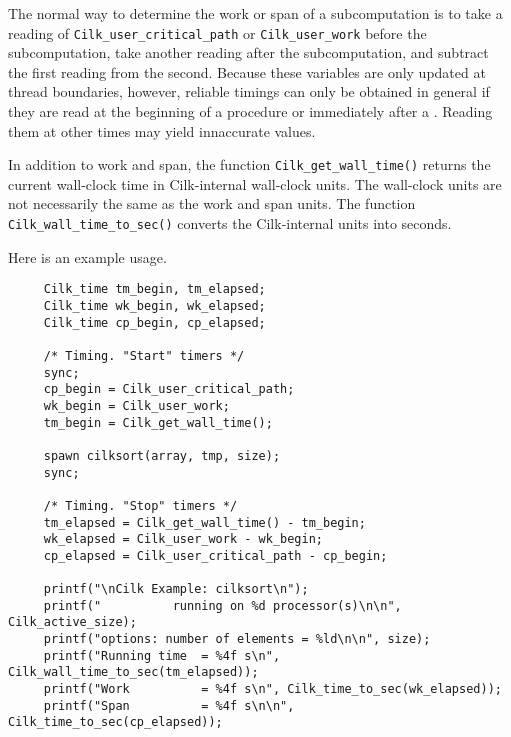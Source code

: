 The normal way to determine the work or span of a subcomputation is to
take a reading of \texttt{Cilk\_user\_critical\_path} or
\texttt{Cilk\_user\_work} before the subcomputation, take another
reading after the subcomputation, and subtract the first reading from
the second.  Because these variables are only updated at thread
boundaries, however, reliable timings can only be obtained in general
if they are read at the beginning of a procedure or immediately after
a .  Reading them at other times may yield innaccurate
values.

In addition to work and span, the function
\texttt{Cilk\_get\_wall\_time()} returns the current wall-clock time
in Cilk-internal wall-clock units. The wall-clock units are not
necessarily the same as the work and span units.  The
function \texttt{Cilk\_wall\_time\_to\_sec()} converts the
Cilk-internal units into seconds.

Here is an example usage.

\begin{verbatim}
     Cilk_time tm_begin, tm_elapsed;
     Cilk_time wk_begin, wk_elapsed;
     Cilk_time cp_begin, cp_elapsed;

     /* Timing. "Start" timers */
     sync;
     cp_begin = Cilk_user_critical_path;
     wk_begin = Cilk_user_work;
     tm_begin = Cilk_get_wall_time();
  
     spawn cilksort(array, tmp, size);
     sync; 

     /* Timing. "Stop" timers */
     tm_elapsed = Cilk_get_wall_time() - tm_begin;
     wk_elapsed = Cilk_user_work - wk_begin;
     cp_elapsed = Cilk_user_critical_path - cp_begin;
 
     printf("\nCilk Example: cilksort\n");
     printf("          running on %d processor(s)\n\n", Cilk_active_size);
     printf("options: number of elements = %ld\n\n", size);
     printf("Running time  = %4f s\n", Cilk_wall_time_to_sec(tm_elapsed));
     printf("Work          = %4f s\n", Cilk_time_to_sec(wk_elapsed));
     printf("Span          = %4f s\n\n", Cilk_time_to_sec(cp_elapsed));
\end{verbatim}
\indextim{|)}


